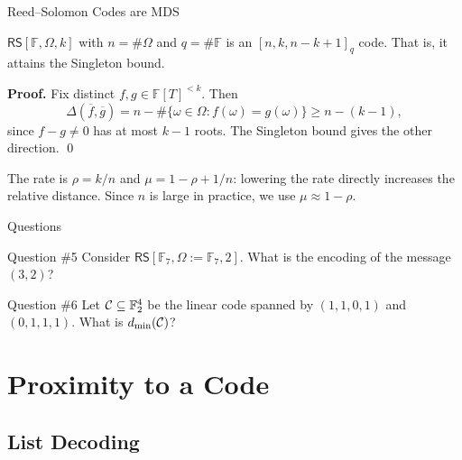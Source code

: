 \documentclass{zkdl-presentation-template}
\begin{document}
    \begin{frame}{Reed--Solomon Codes are MDS}
        \begin{proposition}
            $\mathsf{RS}[\mathbb{F}, \Omega, k]$ with $n = \#\Omega$ and $q = \#\mathbb{F}$ is an $[n,k,n-k+1]_q$ code. That is, it attains the Singleton bound.
        \end{proposition}
        \pause

        \textbf{Proof.} Fix distinct $f, g \in \mathbb{F}[T]^{<k}$. Then
        \begin{equation*}
            \Delta(\overline{f}, \overline{g}) = n - \#\{\omega \in \Omega : f(\omega) = g(\omega)\} \geq n - (k-1),
        \end{equation*}
        since $f - g \neq 0$ has at most $k-1$ roots. The Singleton bound gives the other direction. \qed
        \pause

        \begin{remark}
            The rate is $\rho = k/n$ and $\mu = 1 - \rho + 1/n$: lowering the rate directly increases the relative distance. Since $n$ is large in practice, we use $\mu \approx 1-\rho$.
        \end{remark}
    \end{frame}

    \begin{frame}{Questions}
        \begin{questionblock}{Question \#5}
            Consider $\mathsf{RS}[\mathbb{F}_7,\Omega:=\mathbb{F}_7,2]$. What is the encoding of the message $(3,2)$?
        \end{questionblock}
        \pause

        \begin{questionblock}{Question \#6}
            Let $\mathcal{C} \subseteq \mathbb{F}_2^4$ be the linear code spanned by $(1,1,0,1)$ and $(0,1,1,1)$. What is $d_{\min}(\mathcal{C})$?
        \end{questionblock}
    \end{frame}

    \section{Proximity to a Code}

    \subsection{List Decoding}
\end{document}
